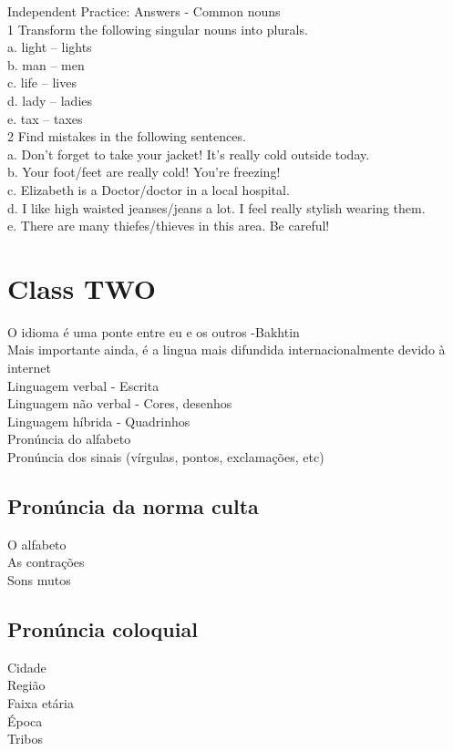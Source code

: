 \documentclass[12pt,a4paper]{article} %
\begin{document}
Independent Practice: Answers - Common nouns\\
1 Transform the following singular nouns into plurals.\\
a. light – lights\\
b. man – men\\
c. life – lives\\
d. lady – ladies\\
e. tax – taxes\\

2 Find mistakes in the following sentences.\\
a. Don't forget to take your jacket! It's really cold outside today.\\
b. Your foot/feet are really cold! You're freezing!\\
c. Elizabeth is a Doctor/doctor in a local hospital.\\
d. I like high waisted jeanses/jeans a lot. I feel really stylish wearing them.\\
e. There are many thiefes/thieves in this area. Be careful!\\
\section{Class TWO}
O idioma é uma ponte entre eu e os outros -Bakhtin\\
Mais importante ainda, é a lingua mais difundida internacionalmente devido à internet\\
Linguagem verbal - Escrita\\
Linguagem não verbal - Cores, desenhos\\
Linguagem híbrida - Quadrinhos\\
Pronúncia do alfabeto\\
Pronúncia dos sinais (vírgulas, pontos, exclamações, etc)

\subsection{Pronúncia da norma culta}
O alfabeto\\
As contrações\\
Sons mutos

\subsection{Pronúncia coloquial}
Cidade\\
Região\\
Faixa etária\\
Época\\
Tribos
\end{document}
